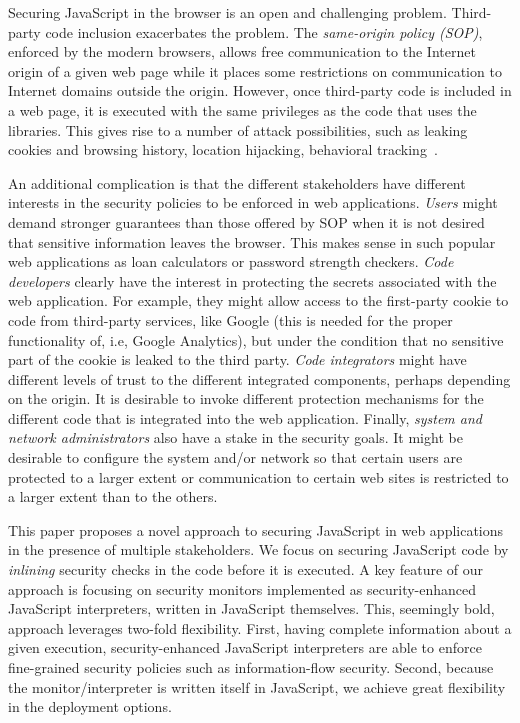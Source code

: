 \documentclass{llncs}
\begin{document}
Securing JavaScript in the browser is an open and challenging
problem. Third-party code inclusion exacerbates the
problem. The \emph{same-origin policy (SOP)}, enforced by the modern
browsers, allows free communication to the Internet origin of a given web page 
while it
places some restrictions on communication to Internet domains
outside the origin. However, once third-party code is
included in a web page, it is executed with the same privileges as the code
that uses the libraries. This gives rise to a number of attack possibilities,
such as leaking cookies and browsing history, location
hijacking, behavioral tracking~\cite{Jang+:CCS10}. 

An additional complication is that the different stakeholders have
different interests in the security policies to be enforced
in web applications. 
%
\emph{Users} might demand stronger guarantees than those
offered by SOP when it is not desired that sensitive information leaves
the browser. This makes sense in such popular web applications as loan
calculators or password strength checkers.
%
\emph{Code developers} clearly have the interest in protecting the
secrets associated with the web application. For example, they might
allow access to the first-party cookie to code from third-party
services, like Google (this is needed for the proper functionality of,
i.e, Google Analytics), but under the condition that no sensitive part
of the cookie is leaked to the third party.
%
\emph{Code integrators} might have different levels of trust to the
different integrated components, perhaps depending on the origin. It
is desirable to invoke different protection mechanisms for the
different code that is integrated into the web application.
%
Finally, \emph{system and network administrators} also have a
stake in the security goals. It might be desirable to configure the
system and/or network so that certain users are protected to a larger
extent or communication to certain web sites is restricted to a larger
extent than to the others.  

This paper proposes a novel approach to securing JavaScript in web
applications in the presence of multiple stakeholders.
%
We focus on securing JavaScript code by \emph{inlining}
security checks in the code before it is executed.
%
A key feature
of our approach is focusing on security monitors implemented as
security-enhanced JavaScript interpreters, written in JavaScript
themselves. This, seemingly bold, approach leverages two-fold
flexibility. First, having complete information about a given
execution, security-enhanced JavaScript interpreters are able to
enforce fine-grained security policies such as information-flow
security. Second, because the monitor/interpreter is written itself in
JavaScript, we achieve great flexibility in the deployment options.
 
\end{document}
